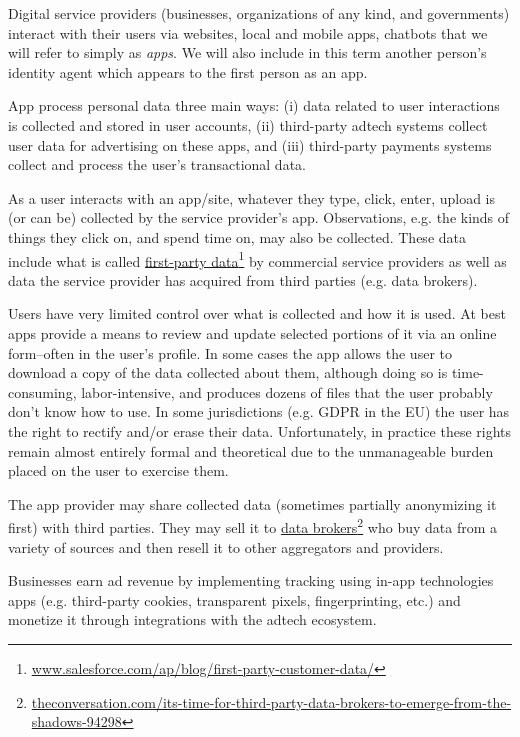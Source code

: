 \documentclass[11pt, oneside]{article}   	%
\newcommand{\hyperfootnote}[1][]{\def\ArgI{{#1}}\hyperfootnoteRelay}
\newcommand\hyperfootnoteRelay[2][]{\href{#1#2}{\ArgI}\footnote{\href{#1#2}{#2}}}
\begin{document}
Digital service providers (businesses, organizations of any kind, and governments) interact with their users via websites, local and mobile apps, chatbots that we will refer to simply as \emph{apps}. We will also include in this term another person's identity agent which appears to the first person as an app.

App process personal data three main ways: (i) data related to user interactions is collected and stored in user accounts, (ii) third-party adtech systems collect user data for advertising on these apps, and (iii) third-party payments systems collect and process the user's transactional data. 

As a user interacts with an app/site, whatever they type, click, enter, upload is (or can be) collected by the service provider's app. Observations, e.g. the kinds of things they click on, and spend time on, may also be collected. These data include what is called \hyperfootnote[first-party data][https://]{www.salesforce.com/ap/blog/first-party-customer-data/} by commercial service providers as well as data the service provider has acquired from third parties (e.g. data brokers).

Users have very limited control over what is collected and how it is used. At best apps provide a means to review and update selected portions of it via an online form--often in the user's profile. In some cases the app allows the user to download a copy of the data collected about them, although doing so is time-consuming, labor-intensive, and produces dozens of files that the user probably don't know how to use. In some jurisdictions (e.g. GDPR in the EU) the user has the right to rectify and/or erase their data. Unfortunately, in practice these rights remain almost entirely formal and theoretical due to the unmanageable burden placed on the user to exercise them. 

The app provider may share collected data (sometimes partially anonymizing it first) with third parties. They may sell it to \hyperfootnote[data brokers][https://]{theconversation.com/its-time-for-third-party-data-brokers-to-emerge-from-the-shadows-94298} who buy data from a variety of sources and then resell it to other aggregators and providers.

Businesses earn ad revenue by implementing tracking using in-app technologies apps (e.g. third-party cookies, transparent pixels, fingerprinting, etc.) and monetize it through integrations with the adtech ecosystem.
\end{document}
